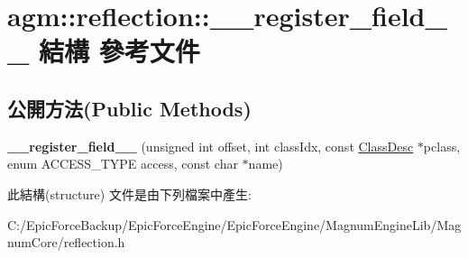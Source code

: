 \hypertarget{structagm_1_1reflection_1_1____register__field____}{}\section{agm\+:\+:reflection\+:\+:\+\_\+\+\_\+register\+\_\+field\+\_\+\+\_\+ 結構 參考文件}
\label{structagm_1_1reflection_1_1____register__field____}
\subsection*{公開方法(Public Methods)}
\begin{DoxyCompactItemize}
\item 
{\bfseries \+\_\+\+\_\+register\+\_\+field\+\_\+\+\_\+} (unsigned int offset, int class\+Idx, const \hyperlink{classagm_1_1reflection_1_1_class_desc}{Class\+Desc} $\ast$pclass, enum A\+C\+C\+E\+S\+S\+\_\+\+T\+Y\+PE access, const char $\ast$name)\hypertarget{structagm_1_1reflection_1_1____register__field_____a4e25bf8483002e0920c7892ab36222fb}{}\label{structagm_1_1reflection_1_1____register__field_____a4e25bf8483002e0920c7892ab36222fb}

\end{DoxyCompactItemize}


此結構(structure) 文件是由下列檔案中產生\+:\begin{DoxyCompactItemize}
\item 
C\+:/\+Epic\+Force\+Backup/\+Epic\+Force\+Engine/\+Epic\+Force\+Engine/\+Magnum\+Engine\+Lib/\+Magnum\+Core/reflection.\+h\end{DoxyCompactItemize}
